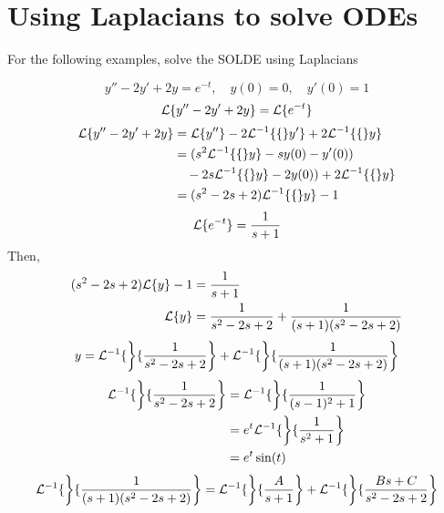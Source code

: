 \documentclass[diffeq.tex]{subfiles}
\begin{document}
    \section{Using Laplacians to solve ODEs}
    For the following examples, solve the SOLDE using Laplacians
    \begin{example}
        \begin{equation}
            y'' - 2y' + 2y = e^{-t},\quad y(0) = 0,\quad y'(0) = 1
        \end{equation}
        \begin{equation}
            \mathcal{L}\{y'' - 2y' + 2y\} = \mathcal{L}\{e^{-t}\}
        \end{equation}
        \begin{alignat}{1}
            \mathcal{L}\{y'' - 2y' + 2y\} &= \mathcal{L}\{y''\} - 2\mathcal{L}^{-1}\{\{\}y'\} + 2\mathcal{L}^{-1}\{\{\}y\}\\
            &= (s^{2}\mathcal{L}^{-1}\{\{\}y\} - sy(0) - y'(0))\\
            &\quad- 2s\mathcal{L}^{-1}\{\{\}y\} - 2y(0)) + 2\mathcal{L}^{-1}\{\{\}y\}\nonumber\\
            &= (s^{2} - 2s + 2)\mathcal{L}^{-1}\{\{\}y\} - 1
        \end{alignat}
        \begin{equation}
            \mathcal{L}\{e^{-t}\} = \frac{1}{s + 1}
        \end{equation}
        Then,
        \begin{alignat}{1}
            (s^{2} - 2s + 2)\mathcal{L}\{y\} - 1 &= \frac{1}{s + 1}\\
            \mathcal{L}\{y\} &= \frac{1}{s^{2} - 2s + 2} + \frac{1}{(s + 1)(s^{2}-2s + 2)}
        \end{alignat}
        \begin{equation}
            y = \mathcal{L}^{-1}\{\left\}\{\frac{1}{s^{2} - 2s + 2}\right\} + \mathcal{L}^{-1}\{\left\}\{\frac{1}{(s + 1)(s^{2}-2s + 2)}\right\}
        \end{equation}
        \begin{alignat}{1}
            \mathcal{L}^{-1}\{\left\}\{\frac{1}{s^{2} - 2s + 2}\right\} &= \mathcal{L}^{-1}\{\left\}\{\frac{1}{(s - 1)^{2} + 1}\right\}\\
            &= e^{t}\mathcal{L}^{-1}\{\left\}\{\frac{1}{s^{2} + 1}\right\}\\
            &= e^{t}\sin(t)
        \end{alignat}
        \begin{alignat}{1}
            \lpinv\left\{\frac{1}{(s + 1)(s^{2} - 2s + 2)}\right\} &= \lpinv\left\{\frac{A}{s + 1}\right\} + \lpinv\left\{\frac{Bs + C}{s^{2} - 2s + 2}\right\}\\

\end{alignat}
\end{example}
\end{document}
